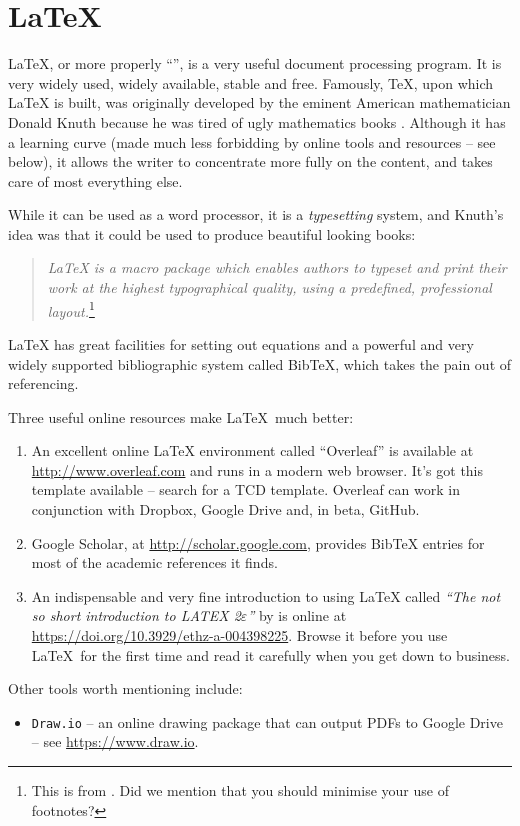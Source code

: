 \chapter{\LaTeX}
\label{latexchapter}
\LaTeX{}, or more properly ``\LaTeXe{}'', is a very useful document processing program. It is very widely used, widely available, stable and free. Famously, \TeX, upon which \LaTeX{} is built, was originally developed by the eminent American mathematician Donald Knuth because he was tired of ugly mathematics books \cite{shustek2008interview}. Although it has a learning curve (made much less forbidding by online tools and resources -- see below), it allows the writer to concentrate more fully on the content, and takes care of most everything else.

While it can be used as a word processor, it is a \emph{typesetting} system, and Knuth's idea was that it could be used to produce beautiful looking books:
\begin{quote}
\emph{\LaTeX{} is a macro package which enables authors to typeset and print their work at the highest typographical quality, using a predefined, professional layout.}\footnote{This is from \citet{oetiker2001not}. Did we mention that you should minimise your use of footnotes?}
\end{quote}
\LaTeX{} has great facilities for setting out equations and a powerful and very widely supported bibliographic system called BibTeX, which takes the pain out of referencing.

Three useful online resources make \LaTeX~much better:
\begin{enumerate}[(1)]
\item An excellent online \LaTeX{} environment called ``Overleaf'' is available at \url{http://www.overleaf.com} and runs in a modern web browser. It's got this template available -- search for a TCD template. Overleaf can work in conjunction with Dropbox, Google Drive and, in beta, GitHub.
\item Google Scholar, at \url{http://scholar.google.com}, provides BibTeX entries for most of the academic references it finds.
\item An indispensable and very fine introduction to using \LaTeX{} called \emph{``The not so short introduction to LATEX 2$\varepsilon$''} by \citet{oetiker2001not} is online at \url{https://doi.org/10.3929/ethz-a-004398225}. Browse it before you use \LaTeX~for the first time and  read it carefully when you get down to business.
\end{enumerate}
Other tools worth mentioning include:
\begin{itemize}
\item \texttt{Draw.io} -- an online drawing package that can output PDFs to Google Drive -- see \url{https://www.draw.io}.
\end{itemize}